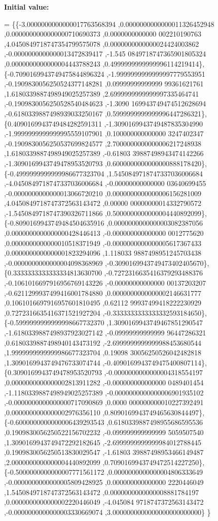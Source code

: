 {\bfseries Initial value\+:}
\begin{DoxyCode}
= \{\{-3.0000000000000017763568394 ,0.0000000000000011326452948 ,0.0000000000000000710690373 ,0.0000000000000
      002210190763 ,4.0450849718747354799575078 ,0.0000000000000024424003862 ,-0.0000000000000013472839417 ,-1.545
      0849718747365901805324 ,0.0000000000000004443788243 ,0.4999999999999996114219414\},
\{-0.7090169943749475844896324 ,-1.9999999999999997779553951 ,-0.1909830056250524377148281 ,0.09999999999999
      99361621761 ,1.6180339887498949025257389 ,2.6999999999999997335464741 ,-0.1909830056250528540484623 ,-1.3090
      169943749474512628694 ,-0.6180339887498939033250167 ,0.5999999999999996447286321\},
\{0.4090169943749484282591311 ,-1.3090169943749487835304990 ,-1.9999999999999995559107901 ,0.100000000000000
      3247402347 ,-0.1909830056250537699824577 ,2.7000000000000006217248938 ,1.6180339887498949025257389 ,-0.61803
      39887498943474142266 ,-1.3090169943749478953520793 ,0.6000000000000000888178420\},
\{-0.4999999999999986677323704 ,1.5450849718747337036006684 ,-4.0450849718747337036006684 ,-0.00000000000000
      03640699455 ,-0.0000000000000013066720210 ,0.0000000000000006156281009 ,4.0450849718747372563143472 ,0.00000
      00000000014332790572 ,-1.5450849718747390326711866 ,0.5000000000000004440892099\},
\{-0.8090169943749484504635916 ,0.0000000000000003082387056 ,0.0000000000000000428446413 ,-0.000000000000000
      0012775620 ,0.0000000000000010518371949 ,-0.0000000000000005617367433 ,0.0000000000000001823294096 ,1.118033
      9887498951245703438 ,-0.0000000000000004098368969 ,-0.3090169943749473402405670\},
\{0.3333333333333334813630700 ,-0.7272316635416379293488376 ,-0.1061016697916956769143226 ,-0.00000000000000
      00137203207 ,-0.6211299937499416001784880 ,0.0000000000000002146631777 ,0.1061016697916957601810495 ,0.62112
      99937499418222230929 ,0.7272316635416371521927204 ,-0.3333333333333332593184650\},
\{-0.5999999999999998667732370 ,1.3090169943749467851290547 ,-1.6180339887498937923027142 ,-0.09999999999999
      96447286321 ,0.6180339887498940143473192 ,-2.6999999999999988453680544 ,1.9999999999999986677323704 ,0.19098
      30056250526042482818 ,1.3090169943749476733074744 ,-0.4090169943749475400807114\},
\{0.3090169943749478953520793 ,-0.0000000000000004318554197 ,0.0000000000000002813911282 ,-0.000000000000000
      0489401454 ,-1.1180339887498949025257389 ,-0.0000000000000006901935102 ,-0.0000000000000000717090869 ,0.0000
      000000000010227392491 ,0.0000000000000002976356110 ,0.8090169943749465630844497\},
\{-0.6000000000000006439293543 ,0.6180339887498955686595536 ,0.1909830056250522156702232 ,-0.099999999999999
      5059507540 ,1.3090169943749472292182645 ,-2.6999999999999984012788445 ,0.1909830056250513830029547 ,-1.61803
      39887498953466149487 ,2.0000000000000004440892099 ,0.7090169943749472514227250\},
\{-0.5000000000000007771561172 ,0.0000000000000004806333649 ,-0.0000000000000005809428925 ,0.000000000000000
      2220446049 ,1.5450849718747372563143472 ,0.0000000000000008881784197 ,0.0000000000000002220446049 ,-4.045084
      9718747372563143472 ,-0.0000000000000003330669074 ,3.0000000000000000000000000\}
\}
\end{DoxyCode}
